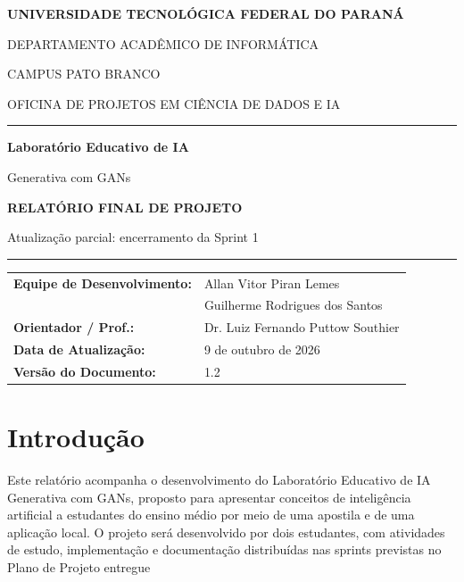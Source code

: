 \documentclass[12pt,a4paper]{article}
\renewcommand{\arraystretch}{1.2}
\begin{document}
\renewcommand{\contentsname}{Sumário}
\renewcommand{\refname}{Referências}

\begin{titlepage}
\thispagestyle{fancy}
\centering
\vspace*{0.7cm}
{\Large\bfseries UNIVERSIDADE TECNOLÓGICA FEDERAL DO PARANÁ\par}
\vspace{0.15cm}
{\large DEPARTAMENTO ACADÊMICO DE INFORMÁTICA\par}
\vspace{0.1cm}
{\small CAMPUS PATO BRANCO\par}
\vspace{0.1cm}
{\small OFICINA DE PROJETOS EM CIÊNCIA DE DADOS E IA\par}
\vspace{1.6cm}
\noindent\rule{\textwidth}{1pt}\par
\vspace{0.2cm}
{\Huge\bfseries\color{azulProfessor}Laboratório Educativo de IA\par Generativa com GANs\par}
\vspace{0.35cm}
{\large\bfseries RELATÓRIO FINAL DE PROJETO\par}
\vspace{0.25cm}
{\small Atualização parcial: encerramento da Sprint 1\par}
\vspace{0.45cm}
\noindent\rule{\textwidth}{1pt}\par
\vspace{1.2cm}
{\renewcommand{\arraystretch}{1.05}
\begin{tabular}{@{}ll@{}}
\textbf{Equipe de Desenvolvimento:} & Allan Vitor Piran Lemes \\
 & Guilherme Rodrigues dos Santos \\
\textbf{Orientador / Prof.:} & Dr. Luiz Fernando Puttow Southier \\
\textbf{Data de Atualização:} & 9 de outubro de 2026 \\
\textbf{Versão do Documento:} & 1.2 \\
\end{tabular}\par}
\end{titlepage}
\setcounter{page}{2}
\tableofcontents
\clearpage

\section{Introdução}
Este relatório acompanha o desenvolvimento do Laboratório Educativo de IA Generativa com GANs, proposto para apresentar conceitos de inteligência artificial a estudantes do ensino médio por meio de uma apostila e de uma aplicação local. O projeto será desenvolvido por dois estudantes, com atividades de estudo, implementação e documentação distribuídas nas sprints previstas no Plano de Projeto entregue
\end{document}
